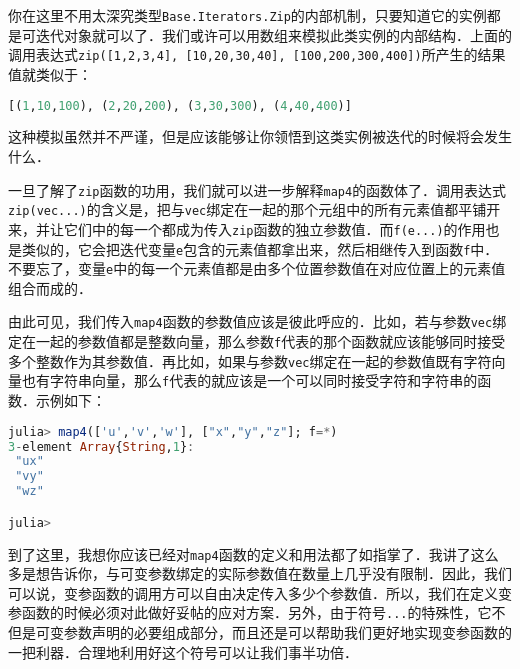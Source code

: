 你在这里不用太深究类型\verb|Base.Iterators.Zip|的内部机制，只要知道它的实例都是可迭代对象就可以了．我们或许可以用数组来模拟此类实例的内部结构．上面的调用表达式\verb|zip([1,2,3,4], [10,20,30,40], [100,200,300,400])|所产生的结果值就类似于：

\begin{lstlisting}[language=julia]
[(1,10,100), (2,20,200), (3,30,300), (4,40,400)]
\end{lstlisting}

这种模拟虽然并不严谨，但是应该能够让你领悟到这类实例被迭代的时候将会发生什么．

一旦了解了\verb|zip|函数的功用，我们就可以进一步解释\verb|map4|的函数体了．调用表达式\verb|zip(vec...)|的含义是，把与\verb|vec|绑定在一起的那个元组中的所有元素值都平铺开来，并让它们中的每一个都成为传入\verb|zip|函数的独立参数值．而\verb|f(e...)|的作用也是类似的，它会把迭代变量\verb|e|包含的元素值都拿出来，然后相继传入到函数\verb|f|中．不要忘了，变量\verb|e|中的每一个元素值都是由多个位置参数值在对应位置上的元素值组合而成的．

由此可见，我们传入\verb|map4|函数的参数值应该是彼此呼应的．比如，若与参数\verb|vec|绑定在一起的参数值都是整数向量，那么参数\verb|f|代表的那个函数就应该能够同时接受多个整数作为其参数值．再比如，如果与参数\verb|vec|绑定在一起的参数值既有字符向量也有字符串向量，那么\verb|f|代表的就应该是一个可以同时接受字符和字符串的函数．示例如下：

\begin{lstlisting}[language=julia]
julia> map4(['u','v','w'], ["x","y","z"]; f=*)
3-element Array{String,1}:
 "ux"
 "vy"
 "wz"

julia> 
\end{lstlisting}

到了这里，我想你应该已经对\verb|map4|函数的定义和用法都了如指掌了．我讲了这么多是想告诉你，与可变参数绑定的实际参数值在数量上几乎没有限制．因此，我们可以说，变参函数的调用方可以自由决定传入多少个参数值．所以，我们在定义变参函数的时候必须对此做好妥帖的应对方案．另外，由于符号\verb|...|的特殊性，它不但是可变参数声明的必要组成部分，而且还是可以帮助我们更好地实现变参函数的一把利器．合理地利用好这个符号可以让我们事半功倍．